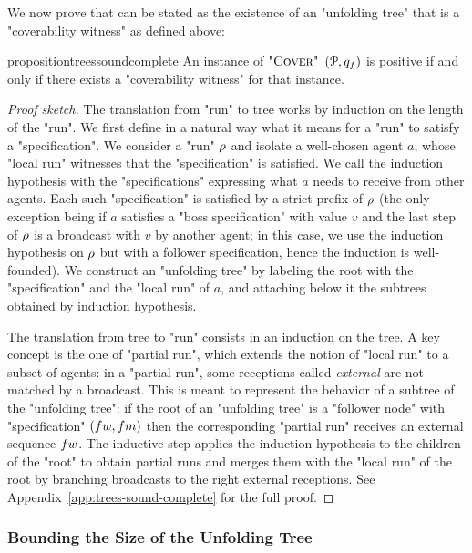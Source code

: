 We now prove that \COVER can be stated as the existence of an "unfolding tree" that is a "coverability witness" as defined above:
\begin{restatable}{proposition}{treessoundcomplete}
\label{prop:trees-sound-complete}
An instance of $\textsc{"Cover"}$ $(\mathcal{P},q_f)$ is positive if and only if there exists a "coverability witness" for that instance.
\end{restatable}
\begin{proof}[Proof sketch]
The translation from "run" to tree works by induction on the length of the "run". We first define in a natural way what it means for a "run" to satisfy a "specification". We consider a "run" $\rho$ and isolate a well-chosen agent $a$, whose "local run" witnesses that the "specification" is satisfied. We call the induction hypothesis with the "specifications" expressing what $a$ needs to receive from other agents. Each such "specification" is satisfied by a strict prefix of $\rho$ (the only exception being if $a$ satisfies a "boss specification" with value $v$ and the last step of $\rho$ is a broadcast with $v$ by another agent; in this case, we use the induction hypothesis on $\rho$ but with a follower specification, hence the induction is well-founded).
We construct an "unfolding tree" by labeling the root with the "specification" and the "local run" of $a$, and attaching below it the subtrees obtained by induction hypothesis.

The translation from tree to "run" consists in an induction on the tree. A key concept is the one of "partial run", which extends the notion of "local run" to a subset of agents: in a "partial run", some receptions called \emph{external} are not matched by a broadcast. This is meant to represent the behavior of a subtree of the "unfolding tree": if the root of an "unfolding tree" is a "follower node" with "specification" $(\followwordspec, \followmessagespec)$ then the corresponding "partial run" receives an external sequence $\followwordspec$. The inductive step applies the induction hypothesis to the children of the "root" to obtain partial runs and merges them with the "local run" of the root by branching broadcasts to the right external receptions. 
See Appendix~\ref{app:trees-sound-complete} for the full proof. 
\end{proof}



\subsubsection{Bounding the Size of the Unfolding Tree}
\label{sec:tree-bounds}

